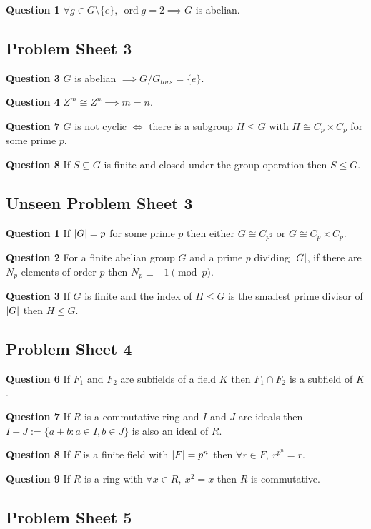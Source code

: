 \documentclass[12pt]{article}
\theoremstyle{definition}
\DeclarePairedDelimiter\abs{\lvert}{\rvert}
\newcommand{\normsg}{\trianglelefteq}
\newcommand{\question}[1]{\noindent\textbf{Question #1} }
\DeclareMathOperator{\ord}{ord}
\begin{document}
\question{1} $\forall g \in G \setminus \{e\},\ \ord{g} = 2 \implies G$ is abelian.

\subsection{Problem Sheet 3}

\question{3} $G$ is abelian $\implies G / G_{tors} = \{e\}$.

\question{4} $Z^m \cong Z^n \implies m = n$.

\question{7} $G$ is not cyclic $\iff$ there is a subgroup $H \leq G$ with $H \cong C_p \times C_p$ for some prime $p$.

\question{8} If $S \subseteq G$ is finite and closed under the group operation then $S \leq G$.

\subsection{Unseen Problem Sheet 3}

\question{1} If $\abs{G} = p$ for some prime $p$ then either $G \cong C_{p^2}$ or $G \cong C_p \times C_p$. 

\question{2} For a finite abelian group $G$ and a prime $p$ dividing $\abs{G}$, if there are $N_p$ elements of order $p$ then $N_p \equiv -1 \pmod p$.

\question{3} If $G$ is finite and the index of $H \leq G$ is the smallest prime divisor of $\abs{G}$ then $H \normsg G$.

\subsection{Problem Sheet 4}

\question{6} If $F_1$ and $F_2$ are subfields of a field $K$ then $F_1 \cap F_2$ is a subfield of $K$. 

\question{7} If $R$ is a commutative ring and $I$ and $J$ are ideals then $I + J := \{a + b : a \in I, b \in J\}$ is also an ideal of $R$.

\question{8} If $F$ is a finite field with $\abs{F} = p^n$ then $\forall r \in F,\ r^{p^n} = r$.

\question{9} If $R$ is a ring with $\forall x \in R,\ x^2 = x$ then $R$ is commutative.

\subsection{Problem Sheet 5}
\end{document}
